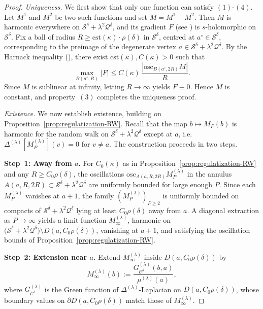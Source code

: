 \documentclass[reqno]{amsart}
\numberwithin{equation}{section}
\theoremstyle{definition}
\theoremstyle{remark}
\newcommand\cQ{\mathcal{Q}}
\newcommand\cS{\mathcal{S}}
\begin{document}
\begin{proof}
\textit{Uniqueness.} We first show that only one function can satisfy $(1)$-$(4)$. Let $M^{1}$ and $M^{2}$ be two such functions and set $M=M^{1}-M^{2}$. Then $M$ is harmonic everywhere on $\cS^\delta+\lambda^2\cQ^\delta$, and its gradient $F$ (see \cite[Def.~4.12]{CLR1}) is $s$-holomorphic on $\cS^\delta$.  
Fix a ball of radius $R \geq \textrm{cst}(\kappa)\cdot  \rho(\delta)$ in $\cS^\delta$, centred at $a^\circ\in\cS^\delta$, corresponding to the preimage of the degenerate vertex $a\in\cS^\delta+\lambda^2\cQ^\delta$. By the Harnack inequality (\cite[Corollary 6.18]{CLR1}), there exist $\textrm{cst}(\kappa),C(\kappa)>0$ such that
\begin{equation}
\max_{B(a^\circ,R)} |F| \le C(\kappa)\,\frac{|\mathrm{osc}_{B(a^\circ,2R)}M|}{R}.
\end{equation}
Since $M$ is sublinear at infinity, letting $R\to\infty$ yields $F\equiv0$. Hence $M$ is constant, and property~$(3)$ completes the uniqueness proof.

\textit{Existence.} We now establish existence, building on Proposition~\ref{prop:regulatization-RW}.  
Recall that the map $b\mapsto M_P(b)$ is harmonic for the random walk on $\cS^\delta+\lambda^2\cQ^\delta$ except at $a$, i.e.\ $\Delta^{(\lambda)}[M_P^{(\lambda)}](v)=0$ for $v\neq a$.  
The construction proceeds in two steps.

\textbf{Step~1: Away from $a$.}  
For $C_0(\kappa)$ as in Proposition~\ref{prop:regulatization-RW} and any $R\ge C_0\rho(\delta)$, the oscillations $\mathrm{osc}_{A(a,R,2R)} M_P^{(\lambda)}$ in the annulus $A(a,R,2R)\subset\cS^\delta+\lambda^2\cQ^\delta$ are uniformly bounded for large enough $P$.  
Since each $M_P^{(\lambda)}$ vanishes at $a+1$, the family $(M_P^{(\lambda)})_{P\ge2}$ is uniformly bounded on compacts of $\cS^\delta+\lambda^2\cQ^\delta$ lying at least $C_0\rho(\delta)$ away from $a$.  
A diagonal extraction as $P\to\infty$ yields a limit function $M_\infty^{(\lambda)}$, harmonic on $\big(\cS^\delta+\lambda^2\cQ^\delta\big)\setminus D(a,C_0\rho(\delta))$, vanishing at $a+1$, and satisfying the oscillation bounds of Proposition~\ref{prop:regulatization-RW}.

\textbf{Step~2: Extension near $a$.}  
Extend $M_\infty^{(\lambda)}$ inside $D(a,C_0\rho(\delta))$ by
\begin{equation}
M_\infty^{(\lambda)}(b):=\frac{G^{(\lambda)}_{\mathcal{C}^\delta}(b,a)}{\mu^{(\lambda)}(a)},
\end{equation}
where $G^{(\lambda)}_{\mathcal{C}^\delta}$ is the Green function of $\Delta^{(\lambda)}$-Laplacian on $D(a,C_0\rho(\delta))$, whose boundary values on $\partial D(a,C_0\rho(\delta))$ match those of $M_\infty^{(\lambda)}$.


\end{proof}
\end{document}
